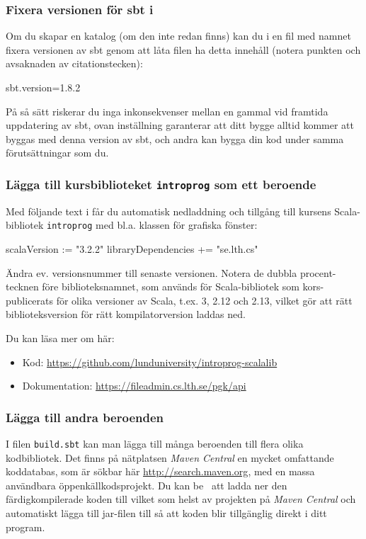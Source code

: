 \subsubsection{Fixera versionen för sbt i }
Om du skapar en katalog  (om den inte redan finns) kan du i en fil med namnet  fixera versionen av sbt genom att låta filen ha detta innehåll (notera punkten och avsaknaden av citationstecken):
\begin{Code}
sbt.version=1.8.2
\end{Code}
På så sätt riskerar du inga inkonsekvenser mellan en gammal  vid framtida uppdatering av sbt, ovan inställning garanterar att ditt bygge alltid kommer att byggas med denna version av sbt, och andra kan bygga din kod under samma förutsättningar som du.

\subsubsection{Lägga till kursbiblioteket \texttt{introprog} som ett beroende}

Med följande text i  får du automatisk nedladdning och tillgång till kursens Scala-bibliotek \texttt{introprog} med bl.a. klassen  för grafiska fönster:

\begin{Code}
scalaVersion := "3.2.2"
libraryDependencies += "se.lth.cs" %
\end{Code}
Ändra ev. versionsnummer till senaste versionen. Notera de dubbla procent-tecknen före biblioteksnamnet, som används för Scala-bibliotek som kors-publicerats för olika versioner av Scala, t.ex. 3, 2.12 och 2.13, vilket gör att rätt biblioteksversion för rätt kompilatorversion laddas ned.

Du kan läsa mer om  här: 
\begin{itemize}
  \item Kod: \url{https://github.com/lunduniversity/introprog-scalalib}
	\item Dokumentation: \url{https://fileadmin.cs.lth.se/pgk/api}
\end{itemize}


\subsubsection{Lägga till andra beroenden}

I filen \texttt{build.sbt} kan man lägga till många beroenden till flera olika kodbibliotek. Det finns på nätplatsen \textit{Maven Central} en mycket omfattande koddatabas, som är sökbar här \url{http://search.maven.org}, med en massa användbara öppenkällkodsprojekt. Du kan be \sbt\ att ladda ner den färdigkompilerade koden till vilket som helst av projekten på \textit{Maven Central} och automatiskt lägga till jar-filen till  så att koden blir tillgänglig direkt i ditt program.

